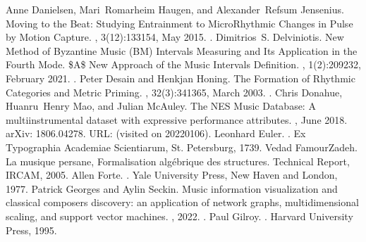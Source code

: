 \documentclass[letterpaper,10pt,english]{sphinxmanual}
\begin{document}
\begin{sphinxthebibliography}{10}
\sphinxAtStartPar
Anne Danielsen, Mari Romarheim Haugen, and Alexander Refsum Jensenius. Moving to the Beat: Studying Entrainment to Micro\sphinxhyphen{}Rhythmic Changes in Pulse by Motion Capture. , 3(1\sphinxhyphen{}2):133\textendash{}154, May 2015. .
\sphinxAtStartPar
Dimitrios S. Delviniotis. New Method of Byzantine Music (BM) Intervals\textquotesingle{} Measuring and Its Application in the Fourth Mode. \$A\$ New Approach of the Music Intervals\textquotesingle{} Definition. , 1(2):209\textendash{}232, February 2021. .
\sphinxAtStartPar
Peter Desain and Henkjan Honing. The Formation of Rhythmic Categories and Metric Priming. , 32(3):341\textendash{}365, March 2003. .
\sphinxAtStartPar
Chris Donahue, Huanru Henry Mao, and Julian McAuley. The NES Music Database: A multi\sphinxhyphen{}instrumental dataset with expressive performance attributes. , June 2018. arXiv: 1806.04278. URL:  (visited on 2022\sphinxhyphen{}01\sphinxhyphen{}06).
\sphinxAtStartPar
Leonhard Euler. . Ex Typographia Academiae Scientiarum, St. Petersburg, 1739.
\sphinxAtStartPar
Vedad FamourZadeh. La musique persane, Formalisation algébrique des structures. Technical Report, IRCAM, 2005.
\sphinxAtStartPar
Allen Forte. . Yale University Press, New Haven and London, 1977.
\sphinxAtStartPar
Patrick Georges and Aylin Seckin. Music information visualization and classical composers discovery: an application of network graphs, multidimensional scaling, and support vector machines. , 2022. .
\sphinxAtStartPar
Paul Gilroy. . Harvard University Press, 1995.

\end{sphinxthebibliography}
\end{document}
